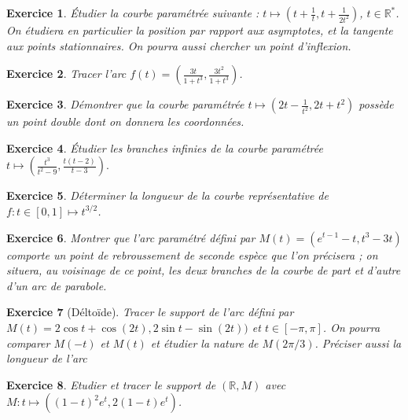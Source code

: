 \documentclass[12pt,a4paper]{article}
\newcommand{\R}{\mathbb{R}}
\theoremstyle{break}
\newtheorem{Exo}{Exercice}
\begin{document}
\begin{Exo}
	\'Etudier la courbe paramétrée suivante : $t\mapsto \left(t+\frac 1t,t+\frac 1{2t^2}\right)$, $t\in\mathbb R^*$.
	On étudiera en particulier la position par rapport aux asymptotes, et la tangente aux points stationnaires. On pourra aussi chercher un point d'inflexion.
\end{Exo}

\begin{Exo}
	Tracer l'arc $f(t)=\left(\frac{3t}{1+t^3},\frac{3t^2}{1+t^3}\right)$.
\end{Exo}

\begin{Exo}
	Démontrer que la courbe paramétrée $t\mapsto \left(\displaystyle 2t-\frac 1{t^2},2t+t^2\right)$ possède un point double dont on donnera les coordonnées.

\end{Exo}




\begin{Exo}
	\'Etudier les branches infinies de la courbe paramétrée $t\mapsto \left(\frac{t^3}{t^2-9},\frac{t(t-2)}{t-3}\right).$

\end{Exo}


\begin{Exo}
	Déterminer la longueur de la courbe représentative de $f:t\in [0,1]\mapsto t^{3/2}$.
\end{Exo}

\begin{Exo}
	Montrer que l’arc paramétré défini par $M(t)=(e^{t-1}-t,t^3-3t)$	comporte un point de rebroussement de seconde espèce que l’on précisera ; on situera, au voisinage de	ce point, les deux branches de la courbe de part et d’autre d’un arc de parabole.
\end{Exo}

\begin{Exo}[Déltoïde]
	Tracer le support de l'arc défini par $M(t)=2\cos t+\cos(2t),2\sin t-\sin(2t))$ et $t\in[-\pi,\pi]$. On pourra comparer $M(-t)$ et $M(t)$ et étudier la nature de $M(2\pi/3)$.  Préciser aussi la longueur de l'arc
\end{Exo}

\begin{Exo}
	Etudier et tracer le support de $(\R,M)$ avec $M:t\mapsto ((1-t)^2e^t,2(1-t)e^t)$.
\end{Exo}
\end{document}
